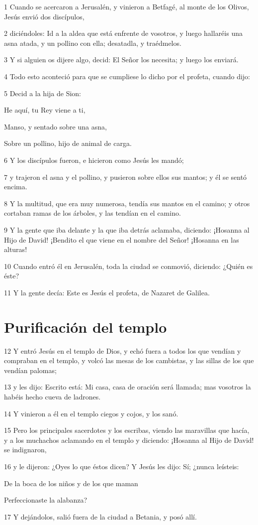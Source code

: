 \par 1 Cuando se acercaron a Jerusalén, y vinieron a Betfagé, al monte de los Olivos, Jesús envió dos discípulos,
\par 2 diciéndoles: Id a la aldea que está enfrente de vosotros, y luego hallaréis una asna atada, y un pollino con ella; desatadla, y traédmelos.
\par 3 Y si alguien os dijere algo, decid: El Señor los necesita; y luego los enviará.
\par 4 Todo esto aconteció para que se cumpliese lo dicho por el profeta, cuando dijo:
\par 5 Decid a la hija de Sion:
\par He aquí, tu Rey viene a ti,
\par Manso, y sentado sobre una asna,
\par Sobre un pollino, hijo de animal de carga.
\par 6 Y los discípulos fueron, e hicieron como Jesús les mandó;
\par 7 y trajeron el asna y el pollino, y pusieron sobre ellos sus mantos; y él se sentó encima.
\par 8 Y la multitud, que era muy numerosa, tendía sus mantos en el camino; y otros cortaban ramas de los árboles, y las tendían en el camino.
\par 9 Y la gente que iba delante y la que iba detrás aclamaba, diciendo: ¡Hosanna al Hijo de David! ¡Bendito el que viene en el nombre del Señor! ¡Hosanna en las alturas!
\par 10 Cuando entró él en Jerusalén, toda la ciudad se conmovió, diciendo: ¿Quién es éste?
\par 11 Y la gente decía: Este es Jesús el profeta, de Nazaret de Galilea.

\section*{Purificación del templo}

\par 12 Y entró Jesús en el templo de Dios, y echó fuera a todos los que vendían y compraban en el templo, y volcó las mesas de los cambistas, y las sillas de los que vendían palomas;
\par 13 y les dijo: Escrito está: Mi casa, casa de oración será llamada; mas vosotros la habéis hecho cueva de ladrones.
\par 14 Y vinieron a él en el templo ciegos y cojos, y los sanó.
\par 15 Pero los principales sacerdotes y los escribas, viendo las maravillas que hacía, y a los muchachos aclamando en el templo y diciendo: ¡Hosanna al Hijo de David! se indignaron,
\par 16 y le dijeron: ¿Oyes lo que éstos dicen? Y Jesús les dijo: Sí; ¿nunca leísteis:
\par De la boca de los niños y de los que maman
\par Perfeccionaste la alabanza?
\par 17 Y dejándolos, salió fuera de la ciudad a Betania, y posó allí.

